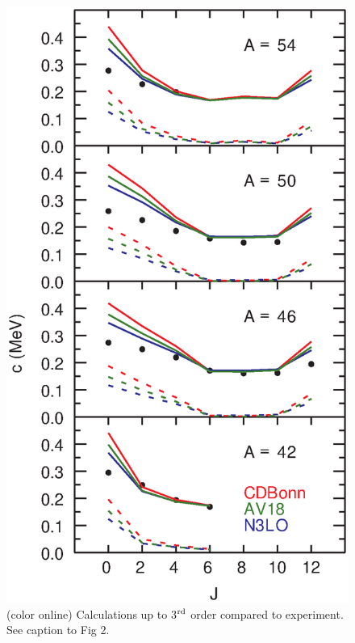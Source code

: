 \documentclass[
10pt,
showpacs,preprintnumbers,footinbib,
amsmath,amssymb,
aps,
prl,twocolumn,groupedaddress,superscriptaddress,
showkeys
]{revtex4-1}
\begin{document}
\begin{figure}
\includegraphics[scale=0.35]{c3.eps}
\caption{(color online) Calculations up to 3$^{\rm rd}$ order compared to
experiment. See caption to Fig 2.}
\end{figure}
\end{document}
